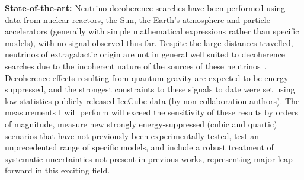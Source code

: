 \documentclass[a4paper,11pt]{article}
\begin{document}
\textbf{State-of-the-art:} Neutrino decoherence searches have been performed using data from nuclear reactors, the Sun, the Earth's atmosphere and particle accelerators (generally with simple mathematical expressions rather than specific models), with no signal observed thus far. Despite the large distances travelled, neutrinos of extragalactic origin are not in general well suited to decoherence searches due to the incoherent nature of the sources of these neutrinos~\cite{PhysRevD.102.115003}. Decoherence effects resulting from quantum gravity are expected to be energy-suppressed, and the strongest constraints to these signals to date were set using low statistics publicly released IceCube data (by non-collaboration authors). The measurements I will perform will exceed the sensitivity of these results by orders of magnitude, measure new strongly energy-suppressed (cubic and quartic) scenarios that have not previously been experimentally tested, test an unprecedented range of specific models, and include a robust treatment of systematic uncertainties not present in previous works, representing  major leap forward in this exciting field. \\






\end{document}
